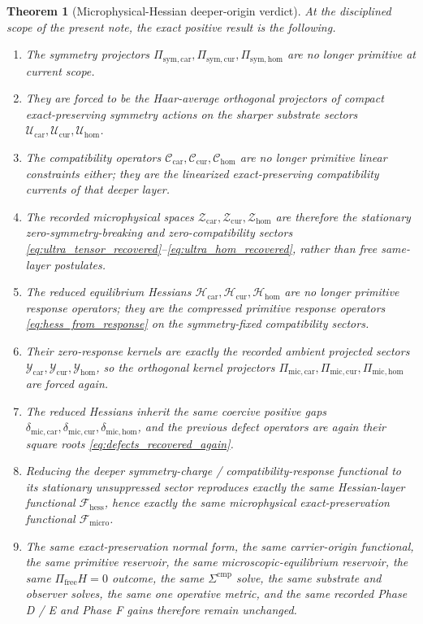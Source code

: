 \documentclass[11pt]{article}
\newcommand{\UltraFunctional}{\mathscr F_{\mathrm{micro}}}
\newcommand{\RootFunctional}{\mathscr F_{\mathrm{hess}}}
\newcommand{\ProtoTensorClass}{\mathscr Y_{\mathrm{car}}}
\newcommand{\ProtoRelabelClass}{\mathscr Y_{\mathrm{cur}}}
\newcommand{\ProtoFreeClass}{\mathscr Y_{\mathrm{hom}}}
\newcommand{\UltraTensorClass}{\mathscr Z_{\mathrm{car}}}
\newcommand{\UltraRelabelClass}{\mathscr Z_{\mathrm{cur}}}
\newcommand{\UltraFreeClass}{\mathscr Z_{\mathrm{hom}}}
\newcommand{\UltraCarProj}{\Pi_{\mathrm{mic,car}}}
\newcommand{\UltraCurProj}{\Pi_{\mathrm{mic,cur}}}
\newcommand{\UltraHomProj}{\Pi_{\mathrm{mic,hom}}}
\newcommand{\UltraCarGap}{\delta_{\mathrm{mic,car}}}
\newcommand{\UltraCurGap}{\delta_{\mathrm{mic,cur}}}
\newcommand{\UltraHomGap}{\delta_{\mathrm{mic,hom}}}
\newcommand{\RootTensorClass}{\mathscr U_{\mathrm{car}}}
\newcommand{\RootRelabelClass}{\mathscr U_{\mathrm{cur}}}
\newcommand{\RootFreeClass}{\mathscr U_{\mathrm{hom}}}
\newcommand{\TensorSymProj}{\Pi_{\mathrm{sym,car}}}
\newcommand{\CurSymProj}{\Pi_{\mathrm{sym,cur}}}
\newcommand{\HomSymProj}{\Pi_{\mathrm{sym,hom}}}
\newcommand{\TensorCompat}{\mathcal C_{\mathrm{car}}}
\newcommand{\CurCompat}{\mathcal C_{\mathrm{cur}}}
\newcommand{\HomCompat}{\mathcal C_{\mathrm{hom}}}
\newcommand{\TensorHess}{\mathcal H_{\mathrm{car}}}
\newcommand{\CurHess}{\mathcal H_{\mathrm{cur}}}
\newcommand{\HomHess}{\mathcal H_{\mathrm{hom}}}
\newtheorem{theorem}{Theorem}
\begin{document}
\begin{theorem}[Microphysical-Hessian deeper-origin verdict]
\label{thm:verdict}
At the disciplined scope of the present note, the exact positive result is the following.
\begin{enumerate}
    \item The symmetry projectors \(\TensorSymProj,\CurSymProj,\HomSymProj\) are no longer primitive at current scope.
    \item They are forced to be the Haar-average orthogonal projectors of compact exact-preserving symmetry actions on the sharper substrate sectors \(\RootTensorClass,\RootRelabelClass,\RootFreeClass\).
    \item The compatibility operators \(\TensorCompat,\CurCompat,\HomCompat\) are no longer primitive linear constraints either; they are the linearized exact-preserving compatibility currents of that deeper layer.
    \item The recorded microphysical spaces \(\UltraTensorClass,\UltraRelabelClass,\UltraFreeClass\) are therefore the stationary zero-symmetry-breaking and zero-compatibility sectors \eqref{eq:ultra_tensor_recovered}--\eqref{eq:ultra_hom_recovered}, rather than free same-layer postulates.
    \item The reduced equilibrium Hessians \(\TensorHess,\CurHess,\HomHess\) are no longer primitive response operators; they are the compressed primitive response operators \eqref{eq:hess_from_response} on the symmetry-fixed compatibility sectors.
    \item Their zero-response kernels are exactly the recorded ambient projected sectors \(\ProtoTensorClass,\ProtoRelabelClass,\ProtoFreeClass\), so the orthogonal kernel projectors \(\UltraCarProj,\UltraCurProj,\UltraHomProj\) are forced again.
    \item The reduced Hessians inherit the same coercive positive gaps \(\UltraCarGap,\UltraCurGap,\UltraHomGap\), and the previous defect operators are again their square roots \eqref{eq:defects_recovered_again}.
    \item Reducing the deeper symmetry-charge / compatibility-response functional to its stationary unsuppressed sector reproduces exactly the same Hessian-layer functional \(\RootFunctional\), hence exactly the same microphysical exact-preservation functional \(\UltraFunctional\).
    \item The same exact-preservation normal form, the same carrier-origin functional, the same primitive reservoir, the same microscopic-equilibrium reservoir, the same \(\Pi_{\mathrm{free}}H=0\) outcome, the same \(\Sigma^{\mathrm{cmp}}\) solve, the same substrate and observer solves, the same one operative metric, and the same recorded Phase D / E and Phase F gains therefore remain unchanged.

\end{enumerate}
\end{theorem}
\end{document}
